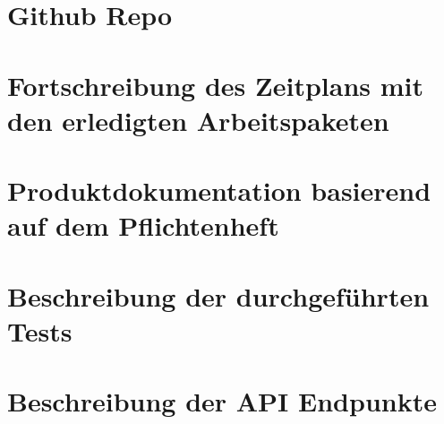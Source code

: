 \documentclass[11pt, a4paper]{article}
\begin{document}
     
\section{Github Repo}
\section{Fortschreibung des Zeitplans mit den erledigten Arbeitspaketen}
\section{Produktdokumentation basierend auf dem Pflichtenheft}
\section{Beschreibung der durchgeführten Tests}
\section{Beschreibung der API Endpunkte}        
\end{document}
